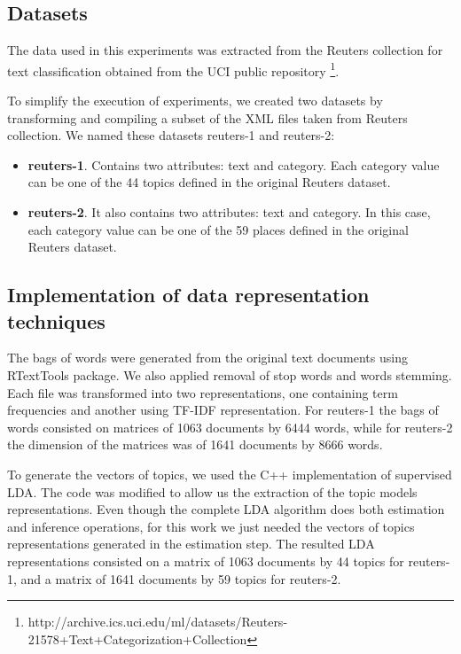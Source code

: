 \documentclass[preprint,12pt,3p]{elsarticle}
\begin{document}
\subsection{Datasets}

The data used in this experiments was extracted from the Reuters collection for text classification obtained from the UCI public repository \footnote{http://archive.ics.uci.edu/ml/datasets/Reuters-21578+Text+Categorization+Collection}.\par

To simplify the execution of experiments, we created two datasets by transforming and compiling a subset of the XML files taken from Reuters collection. We named these datasets reuters-1 and reuters-2:

\begin{itemize}
\item \textbf{reuters-1}. Contains two attributes: text and category. Each category value can be one of the 44 topics defined in the original Reuters dataset.
\item \textbf{reuters-2}. It also contains two attributes: text and category. In this case, each category value can be one of the 59 places defined in the original Reuters dataset.
\end{itemize}

\subsection{Implementation of data representation techniques}

The bags of words were generated from the original text documents using RTextTools package. We also applied removal of stop words and words stemming. Each file was transformed into two representations, one containing term frequencies and another using TF-IDF representation. For reuters-1 the bags of words consisted on matrices of 1063 documents by 6444 words, while for reuters-2 the dimension of the matrices was of 1641 documents by 8666 words.\par

To generate the vectors of topics, we used the C++ implementation of supervised LDA. The code was modified to allow us the extraction of the topic models representations. Even though the complete LDA algorithm does both estimation and inference operations, for this work we just needed the vectors of topics representations generated in the estimation step. The resulted LDA representations consisted on a matrix of 1063 documents by 44 topics for reuters-1, and a matrix of 1641 documents by 59 topics for reuters-2.\par
\end{document}
